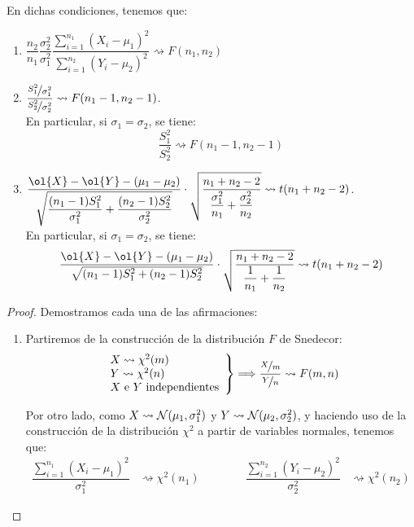 \begin{coro}
    En dichas condiciones, tenemos que:
    \begin{enumerate}
        \item $\displaystyle \dfrac{n_2}{n_1}\dfrac{\sigma_2^2}{\sigma_1^2} \dfrac{\sum\limits_{i=1}^{n_1}{(X_i-\mu_1)}^{2}}{\sum\limits_{i=1}^{n_2}{(Y_i - \mu_2)}^{2}} \rightsquigarrow F(n_1, n_2)$
        \item $\displaystyle \dfrac{\nicefrac{S_1^2}{\sigma_1^2}}{\nicefrac{S_2^2}{\sigma_2^2}} \rightsquigarrow F(n_1-1,n_2-1)$.\\
        En particular, si $\sigma_1 = \sigma_2$, se tiene:
        \begin{equation*}
            \dfrac{S_1^2}{S_2^2}\rightsquigarrow F(n_1-1,n_2-1)
        \end{equation*}
        \item $\displaystyle \dfrac{\ol{X}-\ol{Y} -(\mu_1-\mu_2)}{\sqrt{\dfrac{(n_1-1)S_1^2}{\sigma_1^2} + \dfrac{(n_2-1)S_2^2}{\sigma_2^2}}}\cdot \sqrt{\dfrac{n_1+n_2-2}{\dfrac{\sigma_1^2}{n_1} + \dfrac{\sigma_2^2}{n_2}}} \rightsquigarrow t(n_1+n_2-2)$.\\
        En particular, si $\sigma_1 = \sigma_2$, se tiene:
        \begin{equation*}
            \dfrac{\ol{X}-\ol{Y} -(\mu_1-\mu_2)}{\sqrt{(n_1-1)S_1^2 + (n_2-1)S_2^2}}\cdot \sqrt{\dfrac{n_1+n_2-2}{\dfrac{1}{n_1} + \dfrac{1}{n_2}}} \rightsquigarrow t(n_1+n_2-2)
        \end{equation*}        
    \end{enumerate}
    \begin{proof} Demostramos cada una de las afirmaciones:
    \begin{enumerate}
        \item Partiremos de la construcción de la distribución $F$ de Snedecor:
            \begin{equation*}
                \left.\begin{array}{l}
                    X\rightsquigarrow \chi^2(m) \\
                    Y\rightsquigarrow\chi^2(n)\\
                    \text{$X$ e $Y$ independientes}
                \end{array}\right\} \Longrightarrow \dfrac{\nicefrac{X}{m}}{\nicefrac{Y}{n}} \rightsquigarrow F(m,n)
            \end{equation*}

            Por otro lado, como $X\rightsquigarrow \mathcal{N}(\mu_1, \sigma_1^2)$ y $Y\rightsquigarrow \mathcal{N}(\mu_2, \sigma_2^2)$, y haciendo uso de la construcción de la distribución $\chi^2$ a partir de variables normales, tenemos que:
            \begin{align*}
                \dfrac{\sum\limits_{i=1}^{n_1}{(X_i - \mu_1)}^{2}}{\sigma_1^2} &\rightsquigarrow \chi^2(n_1) \qquad \qquad
                \dfrac{\sum\limits_{i=1}^{n_2}{(Y_i - \mu_2)}^{2}}{\sigma_2^2} &\rightsquigarrow \chi^2(n_2) 
            \end{align*}


\end{enumerate}
\end{proof}
\end{coro}
